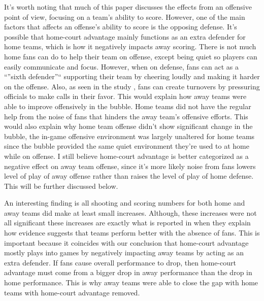 \documentclass[10pt]{article}
\begin{document}
It's worth noting that much of this paper discusses the effects from an
offensive point of view, focusing on a team's ability to score. However, one of 
the main factors that affects an offense's ability to score is the opposing
defense. It's possible that home-court advantage mainly functions as an extra
defender for home teams, which is how it negatively impacts away scoring. There
is not much home fans can do to help their team on offense, except being quiet
so players can easily communicate and focus. However, when on defense, fans can
act as a ``''sixth defender''`` supporting their team by cheering loudly and making it
harder on the offense. Also, as seen in the study \citet{Price}, fans can 
create turnovers by pressuring officials to make calls in their favor.  
This would explain how away teams were able to improve
offensively in the bubble. Home teams did not have the regular help from the
noise of fans that hinders the away team's offensive efforts. This would also
explain why home team offense didn't show significant change in the bubble, the
in-game offensive environment was largely unaltered for home teams since the
bubble provided the same quiet environment they're used to at home while on
offense. I still believe home-court advantage is better categorized as a
negative effect on away team offense, since it's more likely
noise from fans lowers level of play of away offense rather than raises the level
of play of home defense. This will be further discussed below.

An interesting finding is all shooting and scoring numbers for both home and
away teams did make at least small increases. Although, these increases
were not all significant these increases are exactly what is reported in
\citet{Carron2005} when they explain how evidence suggests that teams perform
better with the absence of fans. This is important because it coincides with our
conclusion that home-court advantage mostly plays into games by negatively impacting 
away teams by acting as an extra defender. If fans cause overall performance to drop,
then home-court advantage must come from a bigger drop in away performance than the 
drop in home performance. This is why away teams were able to close the gap with 
home teams with home-court advantage removed.
\end{document}
